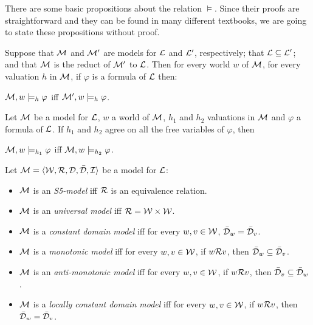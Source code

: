 \qquad There are some basic propositions about the relation $\models$. Since their proofs are straightforward and they can be found in many different textbooks, we are going to state these propositions without proof.

\begin{pro}
Suppose that $\mathcal{M}$ and $\mathcal{M}^{\prime}$ are models for $\mathcal{L}$ and $\mathcal{L}^{\prime}$, respectively; that $\mathcal{L}\subseteq\mathcal{L}^{\prime}$; and that $\mathcal{M}$ is the reduct of $\mathcal{M}^{\prime}$ to $\mathcal{L}$. Then for every world $w$ of $\mathcal{M}$, for every valuation $h$ in $\mathcal{M}$, if $\varphi$ is a formula of $\mathcal{L}$ then:

\begin{center}
 $\mathcal{M},w \models_{h} \varphi$ iff  $\mathcal{M}^{\prime},w \models_{h} \varphi$.
\end{center} 
\end{pro}

\begin{pro}
Let $\mathcal{M}$ be a model for $\mathcal{L}$, $w$ a world of $\mathcal{M}$, $h_{1}$ and $h_{2}$ valuations in $\mathcal{M}$ and $\varphi$ a formula of $\mathcal{L}$. If $h_{1}$ and $h_{2}$ agree on all the free variables of $\varphi$, then

\begin{center}
 $\mathcal{M},w \models_{h_{1}} \varphi$ iff  $\mathcal{M},w \models_{h_{2}} \varphi$.
\end{center} 
\end{pro}






\begin{defn}
Let $\mathcal{M} = \langle\mathcal{W},\mathcal{R}, \mathcal{D}, \bar{\mathcal{D}},\mathcal{I}\rangle$ be a model for $\mathcal{L}$:

\begin{itemize} 
\item $\mathcal{M}$ is an \textit{S5-model} iff $\mathcal{R}$ is an equivalence relation.
\item $\mathcal{M}$ is an \textit{universal model} iff $\mathcal{R} = \mathcal{W}\times \mathcal{W}$.

\item $\mathcal{M}$ is a \textit{constant domain model} iff for every $w,v \in \mathcal{W}$, $\bar{\mathcal{D}}_{w} = \bar{\mathcal{D}}_{v}$.
\item $\mathcal{M}$ is a \textit{monotonic model} iff for every $w,v \in \mathcal{W}$, if $w\mathcal{R} v$, then $\bar{\mathcal{D}}_{w} \subseteq \bar{\mathcal{D}}_{v}$.  
\item $\mathcal{M}$ is an \textit{anti-monotonic model} iff for every $w,v \in \mathcal{W}$, if $w\mathcal{R} v$, then $\bar{\mathcal{D}}_{v} \subseteq \bar{\mathcal{D}}_{w}$.   
\item $\mathcal{M}$ is a \textit{locally constant domain model} iff for every $w,v \in \mathcal{W}$, if $w\mathcal{R} v$, then $\bar{\mathcal{D}}_{w} = \bar{\mathcal{D}}_{v}$. 
\end{itemize}
\end{defn}

